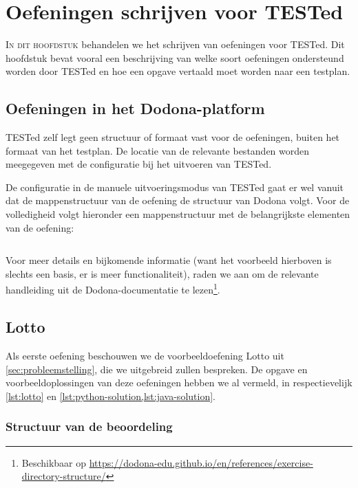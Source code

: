 \chapter{Oefeningen schrijven voor TESTed}\label{ch:nieuwe-oefening}

\lettrine{I}{n dit hoofdstuk} behandelen we het schrijven van oefeningen voor TESTed.
Dit hoofdstuk bevat vooral een beschrijving van welke soort oefeningen ondersteund worden door TESTed en hoe een opgave vertaald moet worden naar een testplan.

\section{Oefeningen in het Dodona-platform}\label{sec:oefeningen-in-het-dodona-platform}

TESTed zelf legt geen structuur of formaat vast voor de oefeningen, buiten het formaat van het testplan.
De locatie van de relevante bestanden worden meegegeven met de configuratie bij het uitvoeren van TESTed.

De configuratie in de manuele uitvoeringsmodus van TESTed gaat er wel vanuit dat de mappenstructuur van de oefening de structuur van Dodona volgt.
Voor de volledigheid volgt hieronder een mappenstructuur met de belangrijkste elementen van de oefening:

\inputminted{text}{code/dirs-exercise.txt}

Voor meer details en bijkomende informatie (want het voorbeeld hierboven is slechts een basis, er is meer functionaliteit), raden we aan om de relevante handleiding uit de Dodona-documentatie te lezen\footnote{Beschikbaar op \url{https://dodona-edu.github.io/en/references/exercise-directory-structure/}}.

\section{Lotto}\label{sec:oefening-lotto}

Als eerste oefening beschouwen we de voorbeeldoefening Lotto uit \cref{sec:probleemstelling}, die we uitgebreid zullen bespreken.
De opgave en voorbeeldoplossingen van deze oefeningen hebben we al vermeld, in respectievelijk \cref{lst:lotto} en \cref{lst:python-solution,lst:java-solution}.

\subsection{Structuur van de beoordeling}\label{subsec:oefening-lotto-structuur}


